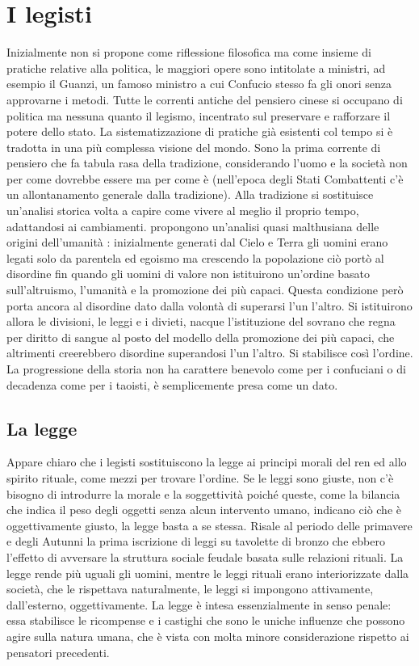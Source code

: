 \documentclass[10pt,a4paper]{report}
\begin{document}
\section{I legisti}
Inizialmente non si propone come riflessione filosofica ma come insieme di pratiche relative alla politica, le maggiori opere sono intitolate a ministri, ad esempio il Guanzi, un famoso ministro a cui Confucio stesso fa gli onori senza approvarne i metodi. Tutte le correnti antiche del pensiero cinese si occupano di politica ma nessuna quanto il legismo, incentrato sul preservare e rafforzare il potere dello stato. La sistematizzazione di pratiche già esistenti col tempo si è tradotta in una più complessa visione del mondo. Sono la prima corrente di pensiero che fa tabula rasa della tradizione, considerando l'uomo e la società non per come dovrebbe essere ma per come è (nell'epoca degli Stati Combattenti c'è un allontanamento generale dalla tradizione). Alla tradizione si sostituisce un'analisi storica volta a capire come vivere al meglio il proprio tempo, adattandosi ai cambiamenti. propongono un'analisi quasi malthusiana delle origini dell'umanità : inizialmente generati dal Cielo e Terra gli uomini erano legati solo da parentela ed egoismo ma crescendo la popolazione ciò portò al disordine fin quando gli uomini di valore non istituirono un'ordine basato sull'altruismo, l'umanità e la promozione dei più capaci. Questa condizione però porta ancora al disordine dato dalla volontà di superarsi l'un l'altro. Si istituirono allora le divisioni, le leggi e i divieti, nacque l'istituzione del sovrano che regna per diritto di sangue al posto del modello della promozione dei più capaci, che altrimenti creerebbero disordine superandosi l'un l'altro. Si stabilisce così l'ordine. La progressione della storia non ha carattere benevolo come per i confuciani o di decadenza come per i taoisti, è semplicemente presa come un dato. 
\subsection{La legge}
Appare chiaro che i legisti sostituiscono la legge ai principi morali del ren ed allo spirito rituale, come mezzi per trovare l'ordine. Se le leggi sono giuste, non c'è bisogno di introdurre la morale e la soggettività poiché queste, come la bilancia che indica il peso degli oggetti senza alcun intervento umano, indicano ciò che è oggettivamente giusto, la legge basta a se stessa. Risale al periodo delle primavere e degli Autunni la prima iscrizione di leggi su tavolette di bronzo che ebbero l'effetto di avversare la struttura sociale feudale basata sulle relazioni rituali. La legge rende più uguali gli uomini, mentre le leggi rituali erano interiorizzate dalla società, che le rispettava naturalmente, le leggi si impongono attivamente, dall'esterno, oggettivamente. La legge è intesa essenzialmente in senso penale: essa stabilisce le ricompense e i castighi che sono le uniche influenze che possono agire sulla natura umana, che è vista con molta minore considerazione rispetto ai pensatori precedenti. \\
\end{document}
